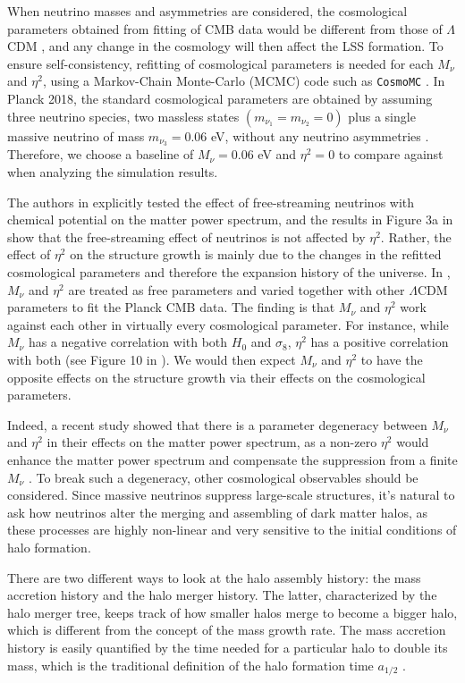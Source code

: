 When neutrino masses and asymmetries are considered, the cosmological parameters obtained from fitting of CMB data would be different from those of $\Lambda$CDM \cite{nu CMB}, and any change in the cosmology will then affect the LSS formation. To ensure self-consistency, refitting of cosmological parameters is needed for each $M_\nu$ and $\eta^2$, using a Markov-Chain Monte-Carlo (MCMC) code such as \texttt{CosmoMC} \cite{cosmomc}. In Planck 2018, the standard cosmological parameters are obtained by assuming three neutrino species, two massless states $(m_{\nu_1} = m_{\nu_2} = 0)$ plus a single massive neutrino of mass $m_{\nu_3} = 0.06$ eV, without any neutrino asymmetries \cite{Planck2018}. Therefore, we choose a baseline of $M_\nu = 0.06$ eV and $\eta^2 = 0$ to compare against when analyzing the simulation results.

The authors in \cite{Carton} explicitly tested the effect of free-streaming neutrinos with chemical potential on the matter power spectrum, and the results in Figure 3a in \cite{Carton} show that the free-streaming effect of neutrinos is not affected by $\eta^2$.
Rather, the effect of $\eta^2$ on the structure growth is mainly due to the changes in the refitted cosmological parameters and therefore the expansion history of the universe.
In \cite{eta_effect}, $M_\nu$ and $\eta^2$ are treated as free parameters and varied together with other $\Lambda$CDM parameters to fit the Planck CMB data. The finding is that $M_\nu$ and $\eta^2$ work against each other in virtually every cosmological parameter.
For instance, while $M_\nu$ has a negative correlation with both $H_0$ and $\sigma_8$, $\eta^2$ has a positive correlation with both (see Figure 10 in \cite{eta_effect}). 
We would then expect $M_\nu$ and $\eta^2$ to have the opposite effects on the structure growth via their effects on the cosmological parameters.


Indeed, a recent study showed that there is a parameter degeneracy between $M_\nu$ and $\eta^2$ in their effects on the matter power spectrum, as a non-zero $\eta^2$ would enhance the matter power spectrum and compensate the suppression from a finite $M_\nu$ \cite{Carton}. To break such a degeneracy, other cosmological observables should be considered. Since massive neutrinos suppress large-scale structures, it's natural to ask how neutrinos alter the merging and assembling of dark matter halos, as these processes are highly non-linear and very sensitive to the initial conditions of halo formation. 

There are two different ways to look at the halo assembly history: the mass accretion history and the halo merger history. The latter, characterized by the halo merger tree, keeps track of how smaller halos merge to become a bigger halo, which is different from the concept of the mass growth rate. The mass accretion history is easily quantified by the time needed for a particular halo to double its mass, which is the traditional definition of the halo formation time $a_{1/2}$ \cite{formtime}. 


